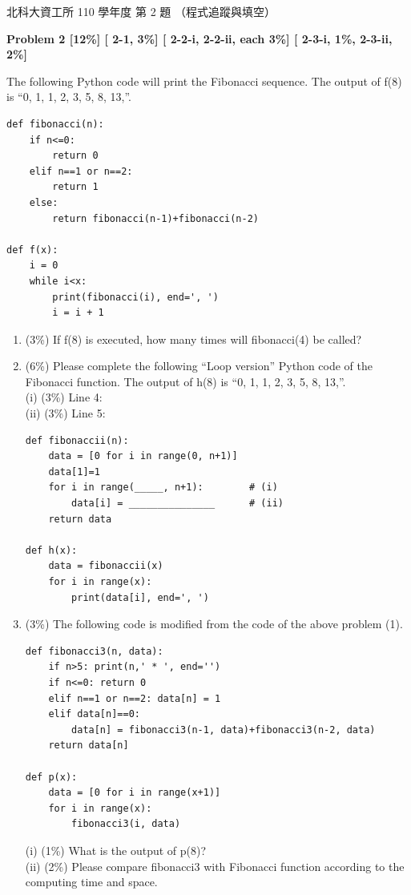 \begin{pastexam}[label={px:ntut-110-prog-02}]{北科大資工所 110 學年度 第 2 題}
（程式追蹤與填空）

\textbf{Problem 2 [12\%] [ 2-1, 3\%] [ 2-2-i, 2-2-ii, each 3\%] [ 2-3-i, 1\%, 2-3-ii, 2\%]}

The following Python code will print the Fibonacci sequence. The output of f(8) is ``0, 1, 1, 2, 3, 5, 8, 13,''.
\begin{verbatim}
def fibonacci(n):
    if n<=0:
        return 0
    elif n==1 or n==2:
        return 1
    else:
        return fibonacci(n-1)+fibonacci(n-2)

def f(x):
    i = 0
    while i<x:
        print(fibonacci(i), end=', ')
        i = i + 1
\end{verbatim}
\begin{enumerate}[label=(\arabic*)]
\item (3\%) If f(8) is executed, how many times will fibonacci(4) be called?
\item (6\%) Please complete the following ``Loop version'' Python code of the Fibonacci function. The output of h(8) is ``0, 1, 1, 2, 3, 5, 8, 13,''.\\
(i) (3\%) Line 4: \underline{\hspace{4em}}\\
(ii) (3\%) Line 5: \underline{\hspace{4em}}
\begin{verbatim}
def fibonaccii(n):
    data = [0 for i in range(0, n+1)]
    data[1]=1
    for i in range(_____, n+1):        # (i)
        data[i] = _______________      # (ii)
    return data

def h(x):
    data = fibonaccii(x)
    for i in range(x):
        print(data[i], end=', ')
\end{verbatim}
\item (3\%) The following code is modified from the code of the above problem (1).
\begin{verbatim}
def fibonacci3(n, data):
    if n>5: print(n,' * ', end='')
    if n<=0: return 0
    elif n==1 or n==2: data[n] = 1
    elif data[n]==0:
        data[n] = fibonacci3(n-1, data)+fibonacci3(n-2, data)
    return data[n]

def p(x):
    data = [0 for i in range(x+1)]
    for i in range(x):
        fibonacci3(i, data)
\end{verbatim}
(i) (1\%) What is the output of p(8)?\\
(ii) (2\%) Please compare fibonacci3 with Fibonacci function according to the computing time and space.
\end{enumerate}
\end{pastexam}

